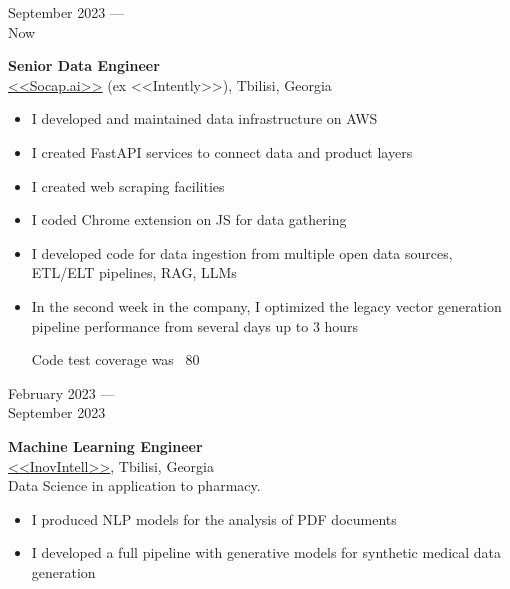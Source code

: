 \documentclass[10pt,a4paper]{article}
\newcommand{\lmpratio}{0.15}
\newcommand{\rmpratio}{0.74}
\newcommand{\vSpace}{0.5cm}
\newcommand{\horizontalSpace}{0.05\textwidth}
\newcommand{\sectionMain}[1]{\textbf{#1}}
\begin{document}
	\begin{minipage}[t]{\lmpratio\textwidth}
		September 2023 --- \\Now
	\end{minipage}
	\hspace{\horizontalSpace}
	\begin{minipage}[t]{\rmpratio\textwidth}
		\sectionMain{Senior Data Engineer}\\
		\href{https://www.ycombinator.com/companies/socap-ai}{<<Socap.ai>>} (ex <<Intently>>), Tbilisi, Georgia\\[0.1cm]	

  
\begin{itemize}
    \item I developed and maintained data infrastructure on AWS
    \item I created FastAPI services to connect data and product layers
    \item I created web scraping facilities
    \item I coded Chrome extension on JS for data gathering
    \item  I developed code for data ingestion from multiple open data sources, ETL/ELT pipelines, RAG, LLMs
    \item  In the second week in the company, I optimized the legacy vector generation pipeline performance from several days up to 3 hours
    
Code test coverage was ~80%
\end{itemize}

        


	\end{minipage}	
	\vspace{\vSpace}

	\begin{minipage}[t]{\lmpratio\textwidth}
		February 2023 --- \\September 2023
	\end{minipage}
	\hspace{\horizontalSpace}
	\begin{minipage}[t]{\rmpratio\textwidth}
		\sectionMain{Machine Learning Engineer}\\
		\href{https://www.inovintell.com/}{<<InovIntell>>}, Tbilisi, Georgia\\[0.1cm]	

Data Science in application to pharmacy. 

\begin{itemize}
    \item I produced NLP models for the analysis of PDF documents
    \item I developed a full pipeline with generative models for synthetic medical data generation
\end{itemize}


	\end{minipage}	
	\vspace{\vSpace}
\end{document}
